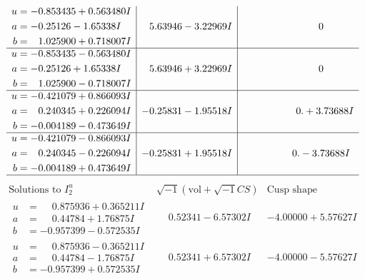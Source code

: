 \documentclass[1p]{elsarticle_modified}
\theoremstyle{definition}
\newcommand{\I}{\sqrt{-1}}
\begin{document}
$$\begin{array}{c|c|c}
\begin{aligned}
u &= -0.853435 + 0.563480 I \\
a &= -0.25126 - 1.65338 I \\
b &= \phantom{-}1.025900 + 0.718007 I\end{aligned}
 & \phantom{-}5.63946 - 3.22969 I & \phantom{-0.000000 } 0 \\ \hline\begin{aligned}
u &= -0.853435 - 0.563480 I \\
a &= -0.25126 + 1.65338 I \\
b &= \phantom{-}1.025900 - 0.718007 I\end{aligned}
 & \phantom{-}5.63946 + 3.22969 I & \phantom{-0.000000 } 0 \\ \hline\begin{aligned}
u &= -0.421079 + 0.866093 I \\
a &= \phantom{-}0.240345 + 0.226094 I \\
b &= -0.004189 - 0.473649 I\end{aligned}
 & -0.25831 - 1.95518 I & \phantom{-0.000000 -}0. + 3.73688 I \\ \hline\begin{aligned}
u &= -0.421079 - 0.866093 I \\
a &= \phantom{-}0.240345 - 0.226094 I \\
b &= -0.004189 + 0.473649 I\end{aligned}
 & -0.25831 + 1.95518 I & \phantom{-0.000000 } 0. - 3.73688 I\\
 \hline 
 \end{array}$$\newpage$$\begin{array}{c|c|c}  
\text{Solutions to }I^u_{2}& \I (\text{vol} + \sqrt{-1}CS) & \text{Cusp shape}\\
 \hline 
\begin{aligned}
u &= \phantom{-}0.875936 + 0.365211 I \\
a &= \phantom{-}0.44784 + 1.76875 I \\
b &= -0.957399 - 0.572535 I\end{aligned}
 & \phantom{-}0.52341 - 6.57302 I & -4.00000 + 5.57627 I \\ \hline\begin{aligned}
u &= \phantom{-}0.875936 - 0.365211 I \\
a &= \phantom{-}0.44784 - 1.76875 I \\
b &= -0.957399 + 0.572535 I\end{aligned}
 & \phantom{-}0.52341 + 6.57302 I & -4.00000 - 5.57627 I \\ \hline\begin{aligned}

\end{aligned}
\end{array}$$
\end{document}
